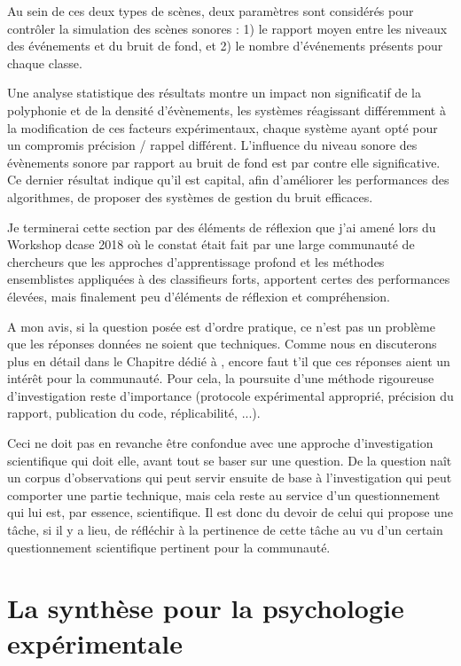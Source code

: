   Au sein de ces deux types de scènes, deux paramètres sont considérés pour contrôler la simulation des scènes sonores : 1) le rapport moyen entre les niveaux des événements et du bruit de fond, et 2) le nombre d'événements présents pour chaque classe.

  Une analyse statistique des résultats\cite{lafayhal-01635414} montre un impact non significatif de la polyphonie et de la densité d'évènements, les systèmes réagissant différemment à la modification de ces facteurs expérimentaux, chaque système ayant opté pour un compromis précision / rappel différent. L'influence du niveau sonore des évènements sonore par rapport au bruit de fond est par contre elle significative. Ce dernier résultat indique qu'il est capital, afin d'améliorer les performances des algorithmes, de proposer des systèmes de gestion du bruit efficaces.

  Je terminerai cette section par des éléments de réflexion que j'ai amené lors du Workshop dcase 2018 où le constat était fait par une large communauté de chercheurs que les approches d'apprentissage profond et les méthodes ensemblistes appliquées à des classifieurs forts, apportent certes des performances élevées, mais finalement peu d'éléments de réflexion et compréhension.

  A mon avis, si la question posée est d'ordre pratique, ce n'est pas un problème que les réponses données ne soient que techniques. Comme nous en discuterons plus en détail dans le Chapitre dédié à , encore faut t'il que ces réponses aient un intérêt pour la communauté. Pour cela, la poursuite d'une méthode rigoureuse d'investigation reste d'importance (protocole expérimental approprié, précision du rapport, publication du code, réplicabilité, ...).

  Ceci ne doit pas en revanche être confondue avec une approche d'investigation scientifique qui doit elle, avant tout se baser sur une question. De la question naît un corpus d'observations qui peut servir ensuite de base à l'investigation qui peut comporter une partie technique, mais cela reste au service d'un questionnement qui lui est, par essence, scientifique. Il est donc du devoir de celui qui propose une tâche, si il y a lieu, de réfléchir à la pertinence de cette tâche au vu d'un certain questionnement scientifique pertinent pour la communauté.

  \section{ \nmu La  synthèse pour la psychologie expérimentale} \label{sec:psycho}

